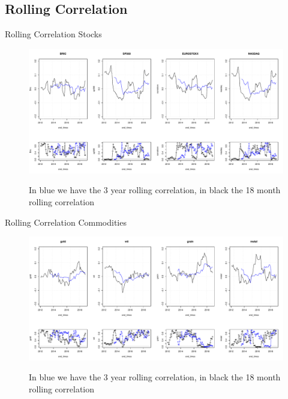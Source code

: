 \documentclass{beamer}
\begin{document}
\subsection{Rolling Correlation}

\begin{frame}{Rolling Correlation Stocks}
\begin{figure}
\includegraphics[width=\textwidth]{rolling_stocks.pdf}
\label{roll_stocks}
\caption{In blue we have the 3 year rolling correlation, in black the 18 month rolling correlation}
\end{figure}
\end{frame}

\begin{frame}{Rolling Correlation Commodities}
\begin{figure}
\includegraphics[width=\textwidth]{rolling_commodities.pdf}
\label{roll_comm}
\caption{In blue we have the 3 year rolling correlation, in black the 18 month rolling correlation}
\end{figure}
\end{frame}
\end{document}
